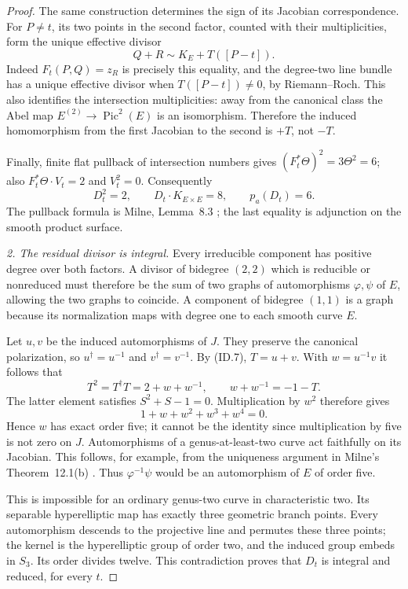 \begin{proof}
The same construction determines the sign of its Jacobian
correspondence. For $P\ne t$, its two points in the second
factor, counted with their multiplicities, form the unique
effective divisor
\[
                   Q+R\sim K_E+T([P-t]).
 \tag{ID.7}
\]
Indeed $F_t(P,Q)=z_R$ is precisely this equality, and the
degree-two line bundle has a unique effective divisor when
$T([P-t])\ne0$, by Riemann--Roch. This also identifies the
intersection multiplicities: away from the canonical class
the Abel map $E^{(2)}\to\operatorname{Pic}^2(E)$ is an
isomorphism. Therefore the induced homomorphism from the
first Jacobian to the second is $+T$, not $-T$.

Finally, finite flat pullback of intersection numbers gives
$(F_t^*\Theta)^2=3\Theta^2=6$; also
$F_t^*\Theta\cdot V_t=2$ and $V_t^2=0$.
Consequently
\[
 D_t^2=2,\qquad
 D_t\cdot K_{E\times E}=8,\qquad p_a(D_t)=6.
 \tag{ID.8}
\]
The pullback formula is Milne, Lemma~8.3
\cite[p.~13]{MilneAV}; the last equality is adjunction on
the smooth product surface.

\emph{2. The residual divisor is integral.}
Every irreducible component has positive degree over both
factors. A divisor of bidegree $(2,2)$ which is reducible or
nonreduced must therefore be the sum of two graphs of
automorphisms $\varphi,\psi$ of $E$, allowing the two graphs
to coincide. A component of bidegree $(1,1)$ is a graph
because its normalization maps with degree one to each
smooth curve $E$.

Let $u,v$ be the induced automorphisms of $J$. They preserve
the canonical polarization, so $u^\dagger=u^{-1}$ and
$v^\dagger=v^{-1}$. By (ID.7), $T=u+v$. With
$w=u^{-1}v$ it follows that
\[
              T^2=T^\dagger T=2+w+w^{-1},
       \qquad w+w^{-1}=-1-T.
 \tag{ID.9}
\]
The latter element satisfies $S^2+S-1=0$. Multiplication
by $w^2$ therefore gives
\[
                  1+w+w^2+w^3+w^4=0.
 \tag{ID.10}
\]
Hence $w$ has exact order five; it cannot be the identity
since multiplication by five is not zero on $J$.
Automorphisms of a genus-at-least-two curve act faithfully
on its Jacobian. This follows, for example, from the
uniqueness argument in Milne's Theorem~12.1(b)
\cite[pp.~38--39]{MilneJV}.
Thus $\varphi^{-1}\psi$ would be an automorphism of $E$
of order five.

This is impossible for an ordinary genus-two curve in
characteristic two. Its separable hyperelliptic map has
exactly three geometric branch points. Every automorphism
descends to the projective line and permutes these three
points; the kernel is the hyperelliptic group of order two,
and the induced group embeds in $S_3$. Its order divides
twelve. This contradiction proves that $D_t$ is integral
and reduced, for every $t$.


\end{proof}
